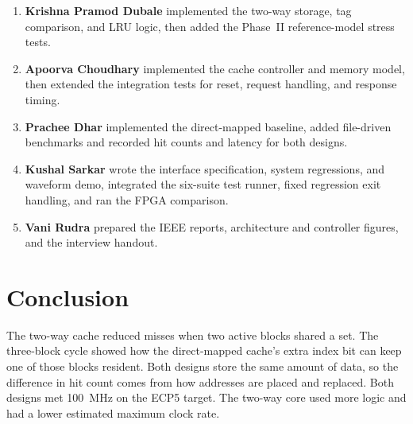 \documentclass[conference]{IEEEtran}
\begin{document}
\begin{enumerate}
\item \textbf{Krishna Pramod Dubale} implemented the two-way storage,
tag comparison, and LRU logic, then added the Phase~II reference-model
stress tests.
\item \textbf{Apoorva Choudhary} implemented the cache controller and
memory model, then extended the integration tests for reset, request
handling, and response timing.
\item \textbf{Prachee Dhar} implemented the direct-mapped baseline,
added file-driven benchmarks and recorded hit counts and latency for
both designs.
\item \textbf{Kushal Sarkar} wrote the interface specification, system
regressions, and waveform demo, integrated the six-suite test runner,
fixed regression exit handling, and ran the FPGA comparison.
\item \textbf{Vani Rudra} prepared the IEEE reports, architecture and
controller figures, and the interview handout.
\end{enumerate}

\section{Conclusion}

The two-way cache reduced misses when two active blocks shared a set.
The three-block cycle showed how the direct-mapped cache's extra index
bit can keep one of those blocks resident. Both designs store the same
amount of data, so the difference in hit count comes from how addresses
are placed and replaced. Both designs met 100~MHz on the ECP5 target. The two-way core used more
logic and had a lower estimated maximum clock rate.



\end{document}
